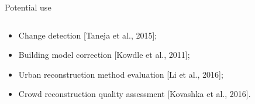 \documentclass[10pt, export]{beamer}
\begin{document}
        \begin{frame}{Potential use}
            \begin{minipage}[0.2\textheight]{\textwidth}
                \begin{columns}[T]
                    \begin{column}{0.48\textwidth}
                        \begin{itemize}[label=$\blacktriangleright$, font=\color{IGNGreen}, itemsep=2em]
                            \item<1-> Change detection [Taneja et al., 2015];
                            \item<2-> Building model correction [Kowdle et al., 2011];
                            \item<3-> Urban reconstruction method evaluation [Li et al., 2016];
                            \item<4-> Crowd reconstruction quality assessment [Kovashka et al., 2016].
                        \end{itemize}
                    \end{column}
                    \begin{column}{0.48\textwidth}
\end{column}
\end{columns}
\end{minipage}
\end{frame}
\end{document}
